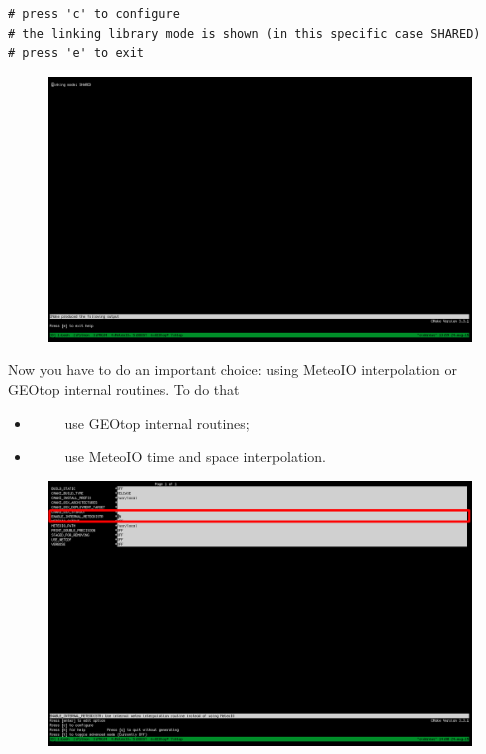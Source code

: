 \begin{itemize}
\pagebreak

\begin{lstlisting}[style=bashStyle]
# press 'c' to configure
# the linking library mode is shown (in this specific case SHARED)
# press 'e' to exit
\end{lstlisting}

\begin{figure}[h]
  \includegraphics[width=\linewidth]{2015/Aug/24/2picGT.png}
\end{figure}

\pagebreak

Now you have to do an important choice: using MeteoIO interpolation or GEOtop internal routines. To do that

\begin{itemize}
\item {} $\qquad$ \newline use GEOtop internal routines;
\item {} $\qquad$ \newline use MeteoIO time and space interpolation.
\end{itemize}

\begin{figure}[h]
  \includegraphics[width=\linewidth]{2015/Aug/24/3picGT.png}
\end{figure}


\end{itemize}
